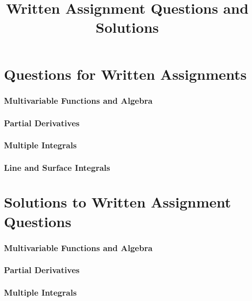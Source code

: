 \documentclass{article}
\title{Written Assignment Questions and Solutions}
\date{}
\author{}
\begin{document}
\maketitle
\tableofcontents 

\part{Questions for Written Assignments}
\section{Multivariable Functions and Algebra}
\section{Partial Derivatives}
\section{Multiple Integrals}


\section{Line and Surface Integrals}
\newpage
\part{Solutions to Written Assignment Questions}
\setcounter{section}{0}

\section{Multivariable Functions and Algebra}
\newpage

\section{Partial Derivatives}
\newpage

\section{Multiple Integrals}

\end{document}
